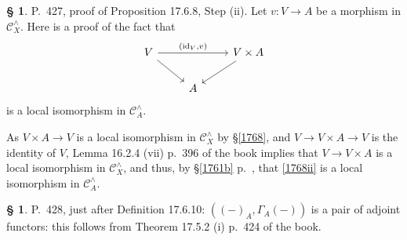 \documentclass[12pt]{article}%
\theoremstyle{remark}
\theoremstyle{definition}
\newtheorem{s}[thm]{\S}%
\newcommand{\C}{\mathcal C}
\DeclareMathOperator{\id}{id}
\begin{document}
%

\begin{s}
P.~427, proof of Proposition 17.6.8, Step (ii). Let $v:V\to A$ be a morphism in $\C_X^\wedge$. Here is a proof of the fact that 
\begin{equation}\label{1768ii}
\begin{tikzcd} 
V\ar{rr}{(\id_V,v)}\ar{dr}&&V\times A\ar{dl}\\ 
{}&A
\end{tikzcd}
\end{equation} 
is a local isomorphism in $\C_A^\wedge$. 

As $V\times A\to V$ is a local isomorphism in $\C_X^\wedge$ by \S\ref{1768}, and $V\to V\times A\to V$ is the identity of $V$, Lemma 16.2.4 (vii) p.~396 of the book implies that $V\to V\times A$ is a local isomorphism in $\C_X^\wedge$, and thus, by \S\ref{1761b} p.~\pageref{1761b}, that \eqref{1768ii} is a local isomorphism in $\C_A^\wedge$.

\end{s} 

%

\begin{s}\label{a428}
P.~428, just after Definition 17.6.10: $((-)_A,\Gamma_A(-))$ is a pair of adjoint functors: this follows from Theorem 17.5.2 (i) p.~424 of the book.
\end{s} 

%
\end{document}
